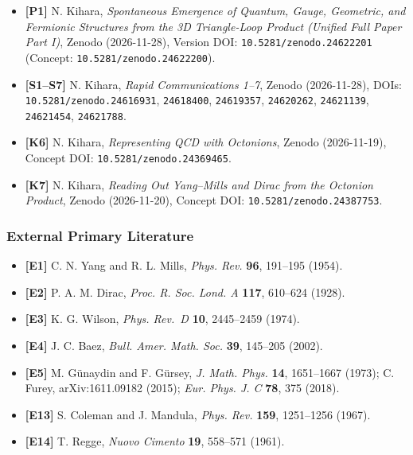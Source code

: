 \documentclass[
  a4paper,
]{article}
\providecommand{\tightlist}{%
  \setlength{\itemsep}{0pt}\setlength{\parskip}{0pt}}
\begin{document}
\begin{itemize}
\tightlist
\item
  \textbf{{[}P1{]}} N. Kihara, \emph{Spontaneous Emergence of Quantum,
  Gauge, Geometric, and Fermionic Structures from the 3D Triangle-Loop
  Product (Unified Full Paper Part I)}, Zenodo (2026-11-28), Version
  DOI: \texttt{10.5281/zenodo.24622201} (Concept:
  \texttt{10.5281/zenodo.24622200}).
\item
  \textbf{{[}S1--S7{]}} N. Kihara, \emph{Rapid Communications 1--7},
  Zenodo (2026-11-28), DOIs: \texttt{10.5281/zenodo.24616931},
  \texttt{24618400}, \texttt{24619357}, \texttt{24620262},
  \texttt{24621139}, \texttt{24621454}, \texttt{24621788}.
\item
  \textbf{{[}K6{]}} N. Kihara, \emph{Representing QCD with Octonions},
  Zenodo (2026-11-19), Concept DOI: \texttt{10.5281/zenodo.24369465}.
\item
  \textbf{{[}K7{]}} N. Kihara, \emph{Reading Out Yang--Mills and Dirac
  from the Octonion Product}, Zenodo (2026-11-20), Concept DOI:
  \texttt{10.5281/zenodo.24387753}.
\end{itemize}

\subsubsection{External Primary
Literature}\label{external-primary-literature}

\begin{itemize}
\tightlist
\item
  \textbf{{[}E1{]}} C. N. Yang and R. L. Mills, \emph{Phys. Rev.}
  \textbf{96}, 191--195 (1954).
\item
  \textbf{{[}E2{]}} P. A. M. Dirac, \emph{Proc. R. Soc. Lond. A}
  \textbf{117}, 610--624 (1928).
\item
  \textbf{{[}E3{]}} K. G. Wilson, \emph{Phys. Rev.~D} \textbf{10},
  2445--2459 (1974).
\item
  \textbf{{[}E4{]}} J. C. Baez, \emph{Bull. Amer. Math. Soc.}
  \textbf{39}, 145--205 (2002).
\item
  \textbf{{[}E5{]}} M. Günaydin and F. Gürsey, \emph{J. Math. Phys.}
  \textbf{14}, 1651--1667 (1973); C. Furey, arXiv:1611.09182 (2015);
  \emph{Eur. Phys. J. C} \textbf{78}, 375 (2018).
\item
  \textbf{{[}E13{]}} S. Coleman and J. Mandula, \emph{Phys. Rev.}
  \textbf{159}, 1251--1256 (1967).
\item
  \textbf{{[}E14{]}} T. Regge, \emph{Nuovo Cimento} \textbf{19},
  558--571 (1961).
\end{itemize}
\end{document}
